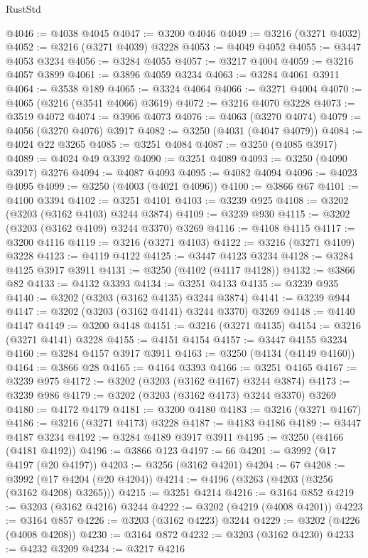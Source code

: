 \begin{lexlean}{RustStd}
\begin{coremodule}
@4046 := @4038 @4045
@4047 := @3200 @4046
@4049 := @3216 (@3271 @4032)
@4052 := @3216 (@3271 @4039) @3228
@4053 := @4049 @4052
@4055 := @3447 @4053 @3234
@4056 := @3284 @4055
@4057 := @3217 @4004
@4059 := @3216 @4057 @3899
@4061 := @3896 @4059 @3234
@4063 := @3284 @4061 @3911
@4064 := @3538 @189
@4065 := @3324 @4064
@4066 := @3271 @4004
@4070 := @4065 (@3216 (@3541 @4066) @3619)
@4072 := @3216 @4070 @3228
@4073 := @3519 @4072
@4074 := @3906 @4073
@4076 := @4063 (@3270 @4074)
@4079 := @4056 (@3270 @4076) @3917
@4082 := @3250 (@4031 (@4047 @4079))
@4084 := @4024 @22 @3265
@4085 := @3251 @4084
@4087 := @3250 (@4085 @3917)
@4089 := @4024 @49 @3392
@4090 := @3251 @4089
@4093 := @3250 (@4090 @3917) @3276
@4094 := @4087 @4093
@4095 := @4082 @4094
@4096 := @4023 @4095
@4099 := @3250 (@4003 (@4021 @4096))
@4100 := @3866 @67
@4101 := @4100 @3394
@4102 := @3251 @4101
@4103 := @3239 @925
@4108 := @3202 (@3203 (@3162 @4103) @3244 @3874)
@4109 := @3239 @930
@4115 := @3202 (@3203 (@3162 @4109) @3244 @3370) @3269
@4116 := @4108 @4115
@4117 := @3200 @4116
@4119 := @3216 (@3271 @4103)
@4122 := @3216 (@3271 @4109) @3228
@4123 := @4119 @4122
@4125 := @3447 @4123 @3234
@4128 := @3284 @4125 @3917 @3911
@4131 := @3250 (@4102 (@4117 @4128))
@4132 := @3866 @82
@4133 := @4132 @3393
@4134 := @3251 @4133
@4135 := @3239 @935
@4140 := @3202 (@3203 (@3162 @4135) @3244 @3874)
@4141 := @3239 @944
@4147 := @3202 (@3203 (@3162 @4141) @3244 @3370) @3269
@4148 := @4140 @4147
@4149 := @3200 @4148
@4151 := @3216 (@3271 @4135)
@4154 := @3216 (@3271 @4141) @3228
@4155 := @4151 @4154
@4157 := @3447 @4155 @3234
@4160 := @3284 @4157 @3917 @3911
@4163 := @3250 (@4134 (@4149 @4160))
@4164 := @3866 @28
@4165 := @4164 @3393
@4166 := @3251 @4165
@4167 := @3239 @975
@4172 := @3202 (@3203 (@3162 @4167) @3244 @3874)
@4173 := @3239 @986
@4179 := @3202 (@3203 (@3162 @4173) @3244 @3370) @3269
@4180 := @4172 @4179
@4181 := @3200 @4180
@4183 := @3216 (@3271 @4167)
@4186 := @3216 (@3271 @4173) @3228
@4187 := @4183 @4186
@4189 := @3447 @4187 @3234
@4192 := @3284 @4189 @3917 @3911
@4195 := @3250 (@4166 (@4181 @4192))
@4196 := @3866 @123
@4197 := 66
@4201 := @3992 (@17 @4197 (@20 @4197))
@4203 := @3256 (@3162 @4201)
@4204 := 67
@4208 := @3992 (@17 @4204 (@20 @4204))
@4214 := @4196 (@3263 (@4203 (@3256 (@3162 @4208) @3265)))
@4215 := @3251 @4214
@4216 := @3164 @852
@4219 := @3203 (@3162 @4216) @3244
@4222 := @3202 (@4219 (@4008 @4201))
@4223 := @3164 @857
@4226 := @3203 (@3162 @4223) @3244
@4229 := @3202 (@4226 (@4008 @4208))
@4230 := @3164 @872
@4232 := @3203 (@3162 @4230)
@4233 := @4232 @3209
@4234 := @3217 @4216

\end{coremodule}
\end{lexlean}

